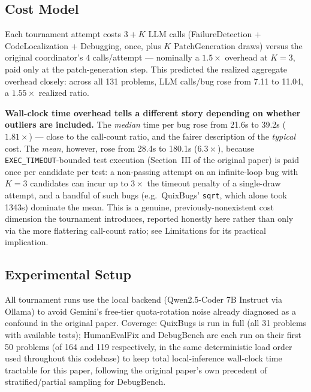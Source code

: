 \documentclass[conference]{IEEEtran}
\begin{document}
\subsection{Cost Model}
Each tournament attempt costs $3 + K$ LLM calls (FailureDetection + CodeLocalization + Debugging, once, plus $K$ PatchGeneration draws) versus the original coordinator's $4$ calls/attempt — nominally a $1.5\times$ overhead at $K{=}3$, paid only at the patch-generation step. This predicted the realized aggregate overhead closely: across all 131 problems, LLM calls/bug rose from 7.11 to 11.04, a $1.55\times$ realized ratio.

\textbf{Wall-clock time overhead tells a different story depending on whether outliers are included.} The \emph{median} time per bug rose from 21.6s to 39.2s ($1.81\times$) — close to the call-count ratio, and the fairer description of the \emph{typical} cost. The \emph{mean}, however, rose from 28.4s to 180.1s ($6.3\times$), because \texttt{EXEC\_TIMEOUT}-bounded test execution (Section~III of the original paper) is paid once per candidate per test: a non-passing attempt on an infinite-loop bug with $K{=}3$ candidates can incur up to $3\times$ the timeout penalty of a single-draw attempt, and a handful of such bugs (e.g.\ QuixBugs' \texttt{sqrt}, which alone took 1343s) dominate the mean. This is a genuine, previously-nonexistent cost dimension the tournament introduces, reported honestly here rather than only via the more flattering call-count ratio; see Limitations for its practical implication.

\subsection{Experimental Setup}
All tournament runs use the local backend (Qwen2.5-Coder 7B Instruct via Ollama) to avoid Gemini's free-tier quota-rotation noise already diagnosed as a confound in the original paper. Coverage: QuixBugs is run in full (all 31 problems with available tests); HumanEvalFix and DebugBench are each run on their first 50 problems (of 164 and 119 respectively, in the same deterministic load order used throughout this codebase) to keep total local-inference wall-clock time tractable for this paper, following the original paper's own precedent of stratified/partial sampling for DebugBench.
\end{document}
